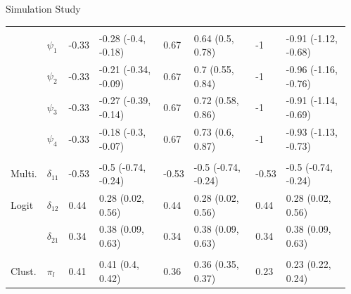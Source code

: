 \documentclass[final]{beamer}
\newlength{\sepwid}
\newlength{\onecolwid}
\newlength{\twocolwid}
\begin{document}
\begin{frame}[t]
\begin{columns}[t]
\begin{column}{\twocolwid}
\begin{columns}[t,totalwidth=\twocolwid]
\begin{column}{\onecolwid}
\begin{block}{Simulation Study}
\begin{table}[t]
\begin{tabular}{llllllll}
\addlinespace[0.3em]
\multicolumn{8}{l}{\textbf{ }}\\
\hspace{1em} & $\psi_{1}$ & -0.33 & -0.28 (-0.4, -0.18) & 0.67 & 0.64 (0.5, 0.78) & -1 & -0.91 (-1.12, -0.68)\\
\hspace{1em} & $\psi_{2}$ & -0.33 & -0.21 (-0.34, -0.09) & 0.67 & 0.7 (0.55, 0.84) & -1 & -0.96 (-1.16, -0.76)\\
\hspace{1em} & $\psi_{3}$ & -0.33 & -0.27 (-0.39, -0.14) & 0.67 & 0.72 (0.58, 0.86) & -1 & -0.91 (-1.14, -0.69)\\
\hspace{1em} & $\psi_{4}$ & -0.33 & -0.18 (-0.3, -0.07) & 0.67 & 0.73 (0.6, 0.87) & -1 & -0.93 (-1.13, -0.73)\\
\addlinespace[0.3em]
\multicolumn{8}{l}{\textbf{ }}\\
\hspace{1em}Multi. & $\delta_{11}$ & -0.53 & -0.5 (-0.74, -0.24) & -0.53 & -0.5 (-0.74, -0.24) & -0.53 & -0.5 (-0.74, -0.24)\\
\hspace{1em}Logit & $\delta_{12}$ & 0.44 & 0.28 (0.02, 0.56) & 0.44 & 0.28 (0.02, 0.56) & 0.44 & 0.28 (0.02, 0.56)\\
\hspace{1em} & $\delta_{21}$ & 0.34 & 0.38 (0.09, 0.63) & 0.34 & 0.38 (0.09, 0.63) & 0.34 & 0.38 (0.09, 0.63)\\
\addlinespace[0.3em]
\multicolumn{8}{l}{\textbf{ }}\\
\hspace{1em}Clust. & $\pi_l$ & 0.41 & 0.41 (0.4, 0.42) & 0.36 & 0.36 (0.35, 0.37) & 0.23 & 0.23 (0.22, 0.24)\\
\bottomrule
\end{tabular}
\end{table}

\end{block}


\end{column} %

\end{columns} %

\end{column} %

\begin{column}{\sepwid}\end{column} %


\end{columns}
\end{frame}
\end{document}
